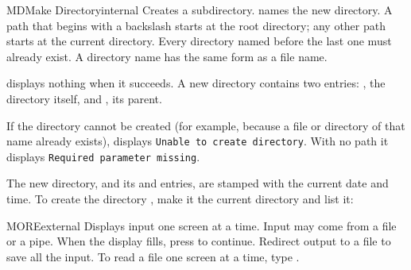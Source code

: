 \begin{DosEntry}{MD}{Make Directory}{internal}
\Purpose Creates a subdirectory.
\Format {}
\Remarks
{} names the new directory.  A path that begins with a backslash
starts at the root directory; any other path starts at the current
directory.  Every directory named before the last one must already exist.
A directory name has the same form as a file name.

 displays nothing when it succeeds.  A new directory contains two
entries: , the directory itself, and , its parent.

If the directory cannot be created (for example, because a file or
directory of that name already exists),  displays
\texttt{Unable to create directory}.  With no path it displays
\texttt{Required parameter missing}.

The new directory, and its  and  entries, are stamped with
the current date and time.
\Example
To create the directory , make it the current directory and
list it:
\end{DosEntry}

\begin{DosEntry}{MORE}{}{external}
\Purpose Displays input one screen at a time.
\Format {}
\Remarks
Input may come from a file or a pipe. When the display fills, press
 to continue. Redirect output to a file to save all the input.
\Example
To read a file one screen at a time, type .
\end{DosEntry}

